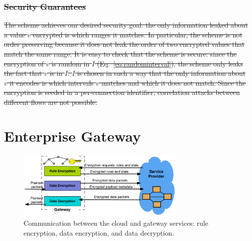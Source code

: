\documentclass[letterpaper,twocolumn,10pt]{article}
\providecommand{\DIFdeltex}[1]{{\protect\color{red}\sout{#1}}}                      %
\providecommand{\DIFdelbegin}{} %
\providecommand{\DIFdelend}{} %
\providecommand{\DIFdel}[1]{\texorpdfstring{\DIFdeltex{#1}}{}} %
\begin{document}
\DIFdelbegin \subsubsection{\DIFdel{Security Guarantees}}
\addtocounter{subsubsection}{-1}%
\DIFdel{The scheme achieves our desired security goal: the only information leaked about a value $v$ encrypted is which ranges it matches. 
In particular, the scheme is not order preserving because it does not leak the order of two encrypted values that match the same range. It is easy to check that the scheme is secure: since the encryption of $v$ is random in $I$ (Eq.~\ref{eq:randominterval}), the scheme only leaks the fact that $v$ is in $I$. $I$ is chosen in such a way that the only information about $v$ it encodes is which intervals $v$ matches and which it does not match. 
Since the encryption is seeded in a per-connection identifier, correlation attacks between different flows are not possible. 
}%

\DIFdelend %

\section{Enterprise Gateway}

\label{sec:gateway}

\begin{figure}[t]
  \centering
  \includegraphics[width=3.25in]{fig/gateway2cloud}
  \caption[]{\label{fig:gatewaymeta} Communication between the cloud and gateway services: rule encryption, data encryption, and data decryption.} 
\end{figure}


\end{document}
